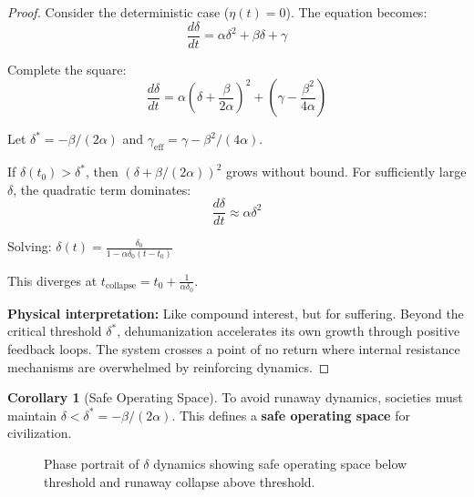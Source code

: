 \documentclass[11pt,a4paper]{article}
\theoremstyle{definition}
\newtheorem{corollary}{Corollary}[theorem]
\theoremstyle{remark}
\begin{document}
\begin{proof}
Consider the deterministic case ($\eta(t) = 0$). The equation becomes:
\[
\frac{d\delta}{dt} = \alpha \delta^2 + \beta \delta + \gamma
\]

Complete the square:
\[
\frac{d\delta}{dt} = \alpha\left(\delta + \frac{\beta}{2\alpha}\right)^2 + \left(\gamma - \frac{\beta^2}{4\alpha}\right)
\]

Let $\delta^* = -\beta/(2\alpha)$ and $\gamma_{\text{eff}} = \gamma - \beta^2/(4\alpha)$.

If $\delta(t_0) > \delta^*$, then $(\delta + \beta/(2\alpha))^2$ grows without bound. For sufficiently large $\delta$, the quadratic term dominates:
\[
\frac{d\delta}{dt} \approx \alpha \delta^2
\]

Solving: $\delta(t) = \frac{\delta_0}{1 - \alpha \delta_0 (t - t_0)}$

This diverges at $t_{\text{collapse}} = t_0 + \frac{1}{\alpha \delta_0}$.

\textbf{Physical interpretation:} Like compound interest, but for suffering. Beyond the critical threshold $\delta^*$, dehumanization accelerates its own growth through positive feedback loops. The system crosses a point of no return where internal resistance mechanisms are overwhelmed by reinforcing dynamics.
\end{proof}

\begin{corollary}[Safe Operating Space]
To avoid runaway dynamics, societies must maintain $\delta < \delta^* = -\beta/(2\alpha)$. This defines a \textbf{safe operating space} for civilization.
\end{corollary}

\begin{figure}[H]
\centering
{}
\caption{Phase portrait of $\delta$ dynamics showing safe operating space below threshold and runaway collapse above threshold.}
\label{fig:delta_phase}
\end{figure}
\end{document}
